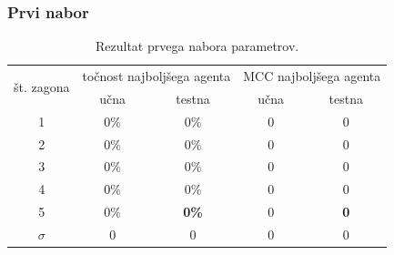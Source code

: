 \subsubsection{Prvi nabor}
\begin{table}[H]
    \caption{Rezultat prvega nabora parametrov.}
    \begin{center}
        \begin{tabular}{|| c | c c || c c ||}
            \hline
            \multirow{2}{*}{št. zagona} & \multicolumn{2}{c||}{točnost najboljšega agenta} & \multicolumn{2}{c||}{MCC najboljšega agenta} \\ \cline{2-5}
            & učna    & testna           & učna  & testna         \\
            \hline
            1        & 0\% & 0\% & 0 & 0          \\
            \hline
            2        & 0\% & 0\%          & 0 & 0          \\
            \hline
            3        & 0\% & 0\%          & 0 & 0          \\
            \hline
            4        & 0\% & 0\%          & 0 & 0          \\
            \hline
            5        & 0\% & \textbf{0\%}          & 0 & \textbf{0} \\
            \hline
            $\sigma$ & 0   & 0            & 0 & 0          \\
            \hline
        \end{tabular}
    \end{center}
    \label{tab:statlog_result_1}
\end{table}


